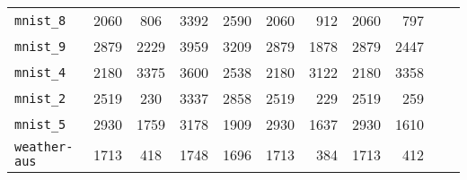 \begin{tabular}{lccrrrrrrrr}
\texttt{mnist\_8} & 2060 & 806 & 3392 & 2590 & 2060 & 912 & 2060 & 797\\
\texttt{mnist\_9} & 2879 & 2229 & 3959 & 3209 & 2879 & 1878 & 2879 & 2447\\
\texttt{mnist\_4} & 2180 & 3375 & 3600 & 2538 & 2180 & 3122 & 2180 & 3358\\
\texttt{mnist\_2} & 2519 & 230 & 3337 & 2858 & 2519 & 229 & 2519 & 259\\
\texttt{mnist\_5} & 2930 & 1759 & 3178 & 1909 & 2930 & 1637 & 2930 & 1610\\
\texttt{weather-aus} & 1713 & 418 & 1748 & 1696 & 1713 & 384 & 1713 & 412\\
\bottomrule
\end{tabular}
